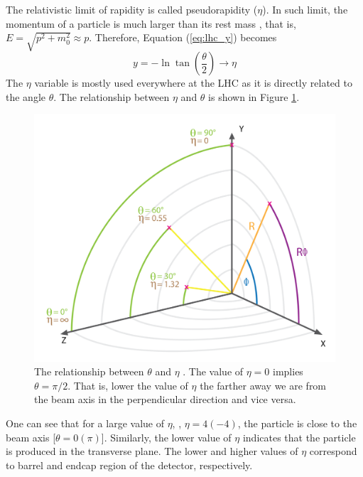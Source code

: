 \begin{itemize}[leftmargin=*]
	The relativistic limit of rapidity is called pseudorapidity ($\eta$). In such limit, 
	the momentum of a particle is much larger than its rest mass 
	, that is, $E = \sqrt{p^2 + m_0^2} \approx p$. Therefore, Equation (\ref{eq:lhc_y}) becomes
	\begin{equation}
		y = - \ln\tan \left(\frac{\theta}{2}\right) \to \eta
	\label{lhc_eta}
	\end{equation}
	The $\eta$ variable is mostly used everywhere at the LHC as it is directly related to the
	angle $\theta$. The relationship between $\eta$ and $\theta$ is shown in Figure 
	\ref{fig:lhc_eta}.
	\begin{figure}
	\begin{center}
	\includegraphics[width=0.50\linewidth]{Experiment/LHC/Image/lhc_eta.png}
		\caption{The relationship between $\theta$ and $\eta$ \cite{Lenzi:2013xpa}. The 
	value of $\eta = 0$ implies $\theta = \pi/2$. That is, lower the value of $\eta$ the farther 
	away we are from the beam axis in the perpendicular direction and vice versa.}
	\label{fig:lhc_eta}
	\end{center}
	\end{figure}
	One can see that for a large value of $\eta$, \eg, $\eta = 4 (-4)$, the particle is 
	close to the beam axis [$\theta = 0 (\pi)$]. Similarly, the lower value of $\eta$ indicates 
	that the particle is produced in the transverse plane. The lower and higher values of
	$\eta$ correspond to barrel and endcap region of the detector, respectively.
\end{itemize}
